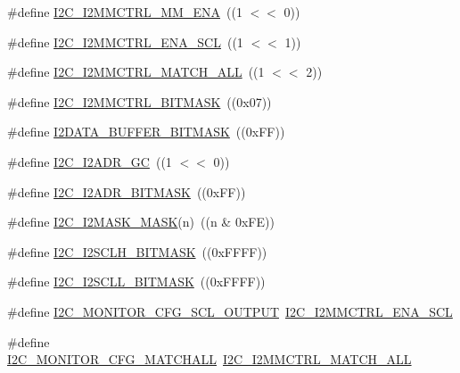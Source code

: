 \begin{DoxyCompactItemize}
\#define \hyperlink{group___i2_c__18_x_x__43_x_x_ga8dc8fa566a5113c3e1b35c0580d90d9f}{I2\+C\+\_\+\+I2\+M\+M\+C\+T\+R\+L\+\_\+\+M\+M\+\_\+\+E\+NA}~((1 $<$$<$ 0))
\item 
\#define \hyperlink{group___i2_c__18_x_x__43_x_x_gabf11567c27c48d795ba0f92cf636dab6}{I2\+C\+\_\+\+I2\+M\+M\+C\+T\+R\+L\+\_\+\+E\+N\+A\+\_\+\+S\+CL}~((1 $<$$<$ 1))
\item 
\#define \hyperlink{group___i2_c__18_x_x__43_x_x_gac7dd5efba503dd79c6b42f3575f70307}{I2\+C\+\_\+\+I2\+M\+M\+C\+T\+R\+L\+\_\+\+M\+A\+T\+C\+H\+\_\+\+A\+LL}~((1 $<$$<$ 2))
\item 
\#define \hyperlink{group___i2_c__18_x_x__43_x_x_gadca0b6beb066a8f6689960c687334ac2}{I2\+C\+\_\+\+I2\+M\+M\+C\+T\+R\+L\+\_\+\+B\+I\+T\+M\+A\+SK}~((0x07))
\item 
\#define \hyperlink{group___i2_c__18_x_x__43_x_x_ga95d605cbb817fa36d9c83545dd23fb5f}{I2\+D\+A\+T\+A\+\_\+\+B\+U\+F\+F\+E\+R\+\_\+\+B\+I\+T\+M\+A\+SK}~((0x\+F\+F))
\item 
\#define \hyperlink{group___i2_c__18_x_x__43_x_x_ga2509515124601141b72080b5daf45009}{I2\+C\+\_\+\+I2\+A\+D\+R\+\_\+\+GC}~((1 $<$$<$ 0))
\item 
\#define \hyperlink{group___i2_c__18_x_x__43_x_x_ga8d5195514172b58efd29f09642566d37}{I2\+C\+\_\+\+I2\+A\+D\+R\+\_\+\+B\+I\+T\+M\+A\+SK}~((0x\+F\+F))
\item 
\#define \hyperlink{group___i2_c__18_x_x__43_x_x_ga697da3f892d87fc247d6e1afafac5a34}{I2\+C\+\_\+\+I2\+M\+A\+S\+K\+\_\+\+M\+A\+SK}(n)~((n \& 0x\+F\+E))
\item 
\#define \hyperlink{group___i2_c__18_x_x__43_x_x_gad6a9a202cf4d30607475338f7b59968a}{I2\+C\+\_\+\+I2\+S\+C\+L\+H\+\_\+\+B\+I\+T\+M\+A\+SK}~((0x\+F\+F\+F\+F))
\item 
\#define \hyperlink{group___i2_c__18_x_x__43_x_x_gadf54076e458f10fc00be5ed9504bc930}{I2\+C\+\_\+\+I2\+S\+C\+L\+L\+\_\+\+B\+I\+T\+M\+A\+SK}~((0x\+F\+F\+F\+F))
\item 
\#define \hyperlink{group___i2_c__18_x_x__43_x_x_ga5f79529ae357b8aa86e6ead24d95167e}{I2\+C\+\_\+\+M\+O\+N\+I\+T\+O\+R\+\_\+\+C\+F\+G\+\_\+\+S\+C\+L\+\_\+\+O\+U\+T\+P\+UT}~\hyperlink{group___i2_c__18_x_x__43_x_x_gabf11567c27c48d795ba0f92cf636dab6}{I2\+C\+\_\+\+I2\+M\+M\+C\+T\+R\+L\+\_\+\+E\+N\+A\+\_\+\+S\+CL}
\item 
\#define \hyperlink{group___i2_c__18_x_x__43_x_x_gadd2b30f5b29839a83c893d88b8d09dd7}{I2\+C\+\_\+\+M\+O\+N\+I\+T\+O\+R\+\_\+\+C\+F\+G\+\_\+\+M\+A\+T\+C\+H\+A\+LL}~\hyperlink{group___i2_c__18_x_x__43_x_x_gac7dd5efba503dd79c6b42f3575f70307}{I2\+C\+\_\+\+I2\+M\+M\+C\+T\+R\+L\+\_\+\+M\+A\+T\+C\+H\+\_\+\+A\+LL}
\end{DoxyCompactItemize}

